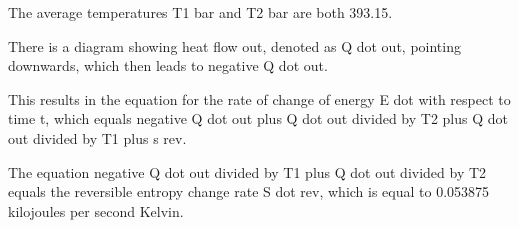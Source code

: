 The average temperatures T1 bar and T2 bar are both 393.15.

There is a diagram showing heat flow out, denoted as Q dot out, pointing downwards, which then leads to negative Q dot out.

This results in the equation for the rate of change of energy E dot with respect to time t, which equals negative Q dot out plus Q dot out divided by T2 plus Q dot out divided by T1 plus s rev.

The equation negative Q dot out divided by T1 plus Q dot out divided by T2 equals the reversible entropy change rate S dot rev, which is equal to 0.053875 kilojoules per second Kelvin.